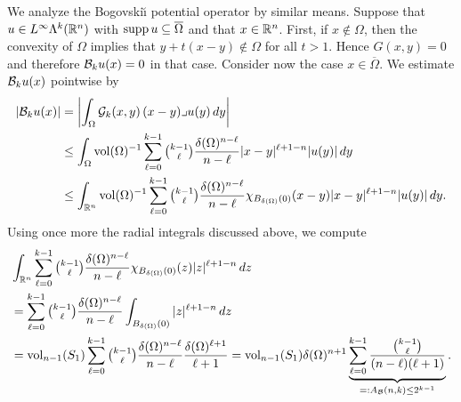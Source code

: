 \documentclass[10pt,letterpaper]{article}
\begin{document}
We analyze the Bogovski\u{\i} potential operator by similar means. 
Suppose that $u \in L^{\infty}\Lambda^{k}({\mathbb R}^{n})$ with $\operatorname{supp} u \subseteq \overline\Omega$ and that $x \in {\mathbb R}^{n}$.
First, if $x \notin \Omega$, then the convexity of $\Omega$ implies that $y + t( x - y ) \notin \Omega$ for all $t > 1$. Hence $G(x,y) = 0$ and therefore ${\mathcal B}_{k} u(x) = 0$ in that case.
Consider now the case $x \in \overline\Omega$. 
We estimate ${\mathcal B}_{k} u(x)$ pointwise by 
\begin{align*}
    \left| {\mathcal B}_{k} u(x) \right|
    &=
    \left| 
        \int_{\Omega} {\mathcal G}_{k}(x,y) \,(x-y)\lrcorner u(y)\,dy
    \right| 
    \\&\leq 
    \int_{\Omega} \operatorname{vol}(\Omega)^{-1} \sum_{\ell=0}^{k-1}\tbinom{k-1}{\ell} \frac{ {\delta}(\Omega)^{n-\ell} }{n-\ell} |x-y|^{\ell+1-n} |u(y)| \,dy
    \\&\leq 
    \int_{{\mathbb R}^{n}} \operatorname{vol}(\Omega)^{-1} \sum_{\ell=0}^{k-1}\tbinom{k-1}{\ell} \frac{ {\delta}(\Omega)^{n-\ell} }{n-\ell} \chi_{B_{{\delta}(\Omega)}(0)}(x-y) |x-y|^{\ell+1-n} |u(y)| \,dy
    .
\end{align*}
Using once more the radial integrals discussed above, we compute 
\begin{align*}
    &
    \int_{{\mathbb R}^{n}} \sum_{\ell=0}^{k-1} \tbinom{k-1}{\ell} \frac{ {\delta}(\Omega)^{n-\ell} }{n-\ell} \chi_{B_{{\delta}(\Omega)}(0)}(z) |z|^{\ell+1-n} \,dz
    \\&
    =
    \sum_{\ell=0}^{k-1} \tbinom{k-1}{\ell} \frac{ {\delta}(\Omega)^{n-\ell} }{n-\ell} \int_{B_{{\delta}(\Omega)}(0)} |z|^{\ell+1-n} \,dz
    \\&
    =
    \operatorname{vol}_{n-1}(S_1) \sum_{\ell=0}^{k-1} \tbinom{k-1}{\ell} \frac{ {\delta}(\Omega)^{n-\ell} }{n-\ell} \frac{{\delta}(\Omega)^{\ell+1}}{\ell+1}
    =
    \operatorname{vol}_{n-1}(S_1) {\delta}(\Omega)^{n+1} \underbrace{ \sum_{\ell=0}^{k-1} \frac{ \tbinom{k-1}{\ell} }{ (n-\ell)(\ell+1) } }_{ =: A_{{\mathcal B}}(n,k) \leq 2^{k-1}}
    \label{equation:A_Bogov}
    .
\end{align*}
\end{document}
